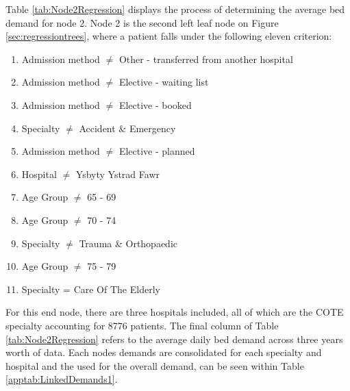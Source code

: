 \documentclass[../thesis.tex]{subfiles}
\begin{document}
Table \ref{tab:Node2Regression} displays the process of determining the average bed demand for node 2. Node 2 is the second left leaf node on Figure \ref{sec:regressiontrees}, where a patient falls under the following eleven criterion:
\begin{enumerate}
    \item Admission method $\neq$ Other - transferred from another hospital
    \item Admission method $\neq$ Elective - waiting list
    \item Admission method $\neq$ Elective - booked
    \item Specialty $\neq$ Accident \& Emergency
    \item Admission method $\neq$ Elective - planned
    \item Hospital $\neq$ Ysbyty Ystrad Fawr
    \item Age Group $\neq$ 65 - 69
    \item Age Group $\neq$ 70 - 74
    \item Specialty $\neq$ Trauma \& Orthopaedic
    \item Age Group $\neq$ 75 - 79
    \item Specialty = Care Of The Elderly
\end{enumerate}

For this end node, there are three hospitals included, all of which are the COTE specialty accounting for 8776 patients. The final column of Table \ref{tab:Node2Regression} refers to the average daily bed demand across three years worth of data. Each nodes demands are consolidated for each specialty and hospital and the used for the overall demand, can be seen within Table \ref{apptab:LinkedDemands1}.
\begin{table}[h!]
    \centering{}
    \caption{Regression Tree Node 2 - Average LOS}
    \label{tab:Node2Regression}
\end{table}
\end{document}
